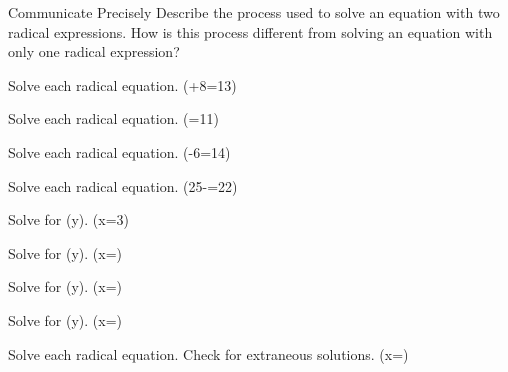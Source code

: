 \documentclass{article}
\newenvironment{practice}[2]{}{}        %
\newcommand{\answer}[1]{}               %
\begin{document}
\begin{practice}{20}{2}
Communicate Precisely Describe the process used to solve an equation with two radical expressions. How is this process different from solving an equation with only one radical expression?
\answer{The process of solving an equation with two radicals is like solving an equation with one radical. Simplify the equation and square both sides to eliminate one radical; because there are two radicals, you have to square both sides a second time; Rewrite the equation in standard form, and then factor the equation using the Zero-Product Property to solve for the variable. There are additional steps needed to eliminate the second radical.}
\end{practice}

\begin{practice}{21}{1}
Solve each radical equation. (+8=13)
\answer{(x=125)}
\end{practice}

\begin{practice}{22}{1}
Solve each radical equation. (=11)
\answer{(x=30.25)}
\end{practice}

\begin{practice}{23}{1}
Solve each radical equation. (-6=14)
\answer{(x=325)}
\end{practice}

\begin{practice}{24}{1}
Solve each radical equation. (25-=22)
\answer{(x=81)}
\end{practice}

\begin{practice}{25}{1}
Solve for (y). (x=3)
\answer{(y=\frac{x^3}{27}-15)}
\end{practice}

\begin{practice}{26}{1}
Solve for (y). (x=)
\answer{(y=338x^2)}
\end{practice}

\begin{practice}{27}{1}
Solve for (y). (x=)
\answer{(y=0.0025x^2+14.2)}
\end{practice}

\begin{practice}{28}{1}
Solve for (y). (x=)
\answer{(y=81x^4)}
\end{practice}

\begin{practice}{29}{1}
Solve each radical equation. Check for extraneous solutions. (x=)
\answer{(x=3)}
\end{practice}
\end{document}

